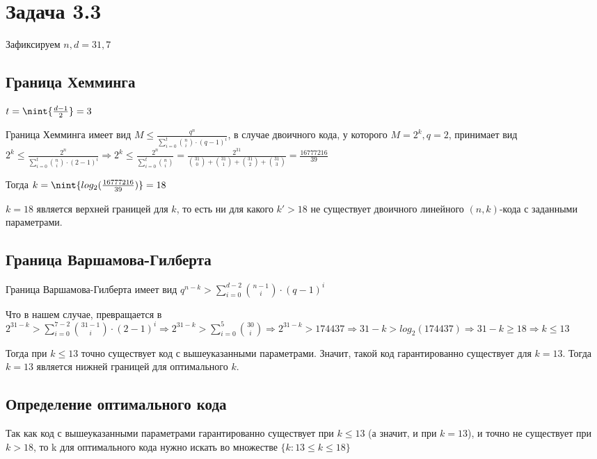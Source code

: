 \documentclass{article}
\DeclarePairedDelimiter{\nint}\lfloor\rfloor
\begin{document}
	\section{Задача 3.3}
	
	Зафиксируем $n, d = 31, 7$
	
	\subsection{Граница Хемминга}
	
	 $t = \nint{\frac{d - 1}{2}} = 3$
	 
	 Граница Хемминга имеет вид $M \leq \frac{q^n}{\sum\limits_{i = 0}^t \binom{n}{i} \cdot (q - 1)^i}$, в случае двоичного кода, у которого $M = 2^k, q = 2$, принимает вид $2^k \leq \frac{2^n}{\sum\limits_{i = 0}^t \binom{n}{i} \cdot (2 - 1)^i} \Rightarrow 2^k \leq \frac{2^n}{\sum\limits_{i = 0}^t \binom{n}{i}} = \frac{2^{31}}{\binom{31}{0} + \binom{31}{1}  + \binom{31}{2}  + \binom{31}{3} } = \frac{16777216}{39}$
	 
	 Тогда $k = \nint{log_2(\frac{16777216}{39})} = 18$
	 
	 $k = 18$ является верхней границей для $k$, то есть ни для какого $k' > 18$ не существует двоичного линейного $(n, k)$-кода с заданными параметрами.
	 
	 \subsection{Граница Варшамова-Гилберта}
	 
	 Граница Варшамова-Гилберта имеет вид $q^{n - k} > \sum\limits_{i = 0}^{d - 2} \binom{n - 1}{i} \cdot (q - 1)^i$
	 
	 Что в нашем случае, превращается в $2^{31 - k} > \sum\limits_{i = 0}^{7 - 2} \binom{31 - 1}{i} \cdot (2 - 1)^i \Rightarrow  2^{31 - k} > \sum\limits_{i = 0}^{5} \binom{30}{i} \Rightarrow 2^{31 - k} > 174437 \Rightarrow 31 - k > log_2(174437) \Rightarrow 31 - k \geq 18 \Rightarrow k \leq 13$
	 
	 Тогда при $k \leq 13$ точно существует код с вышеуказанными параметрами. Значит, такой код гарантированно существует для $k = 13$. Тогда $k = 13$ является нижней границей для оптимального $k$.
	 
	 \subsection{Определение оптимального кода}
	 
	 Так как код с вышеуказанными параметрами гарантированно существует при $k \leq 13$ (а значит,  и при $k = 13$), и точно не существует при $k > 18$, то k для оптимального кода нужно искать во множестве $\{k: 13 \leq k \leq 18\}$
	 
\end{document}
